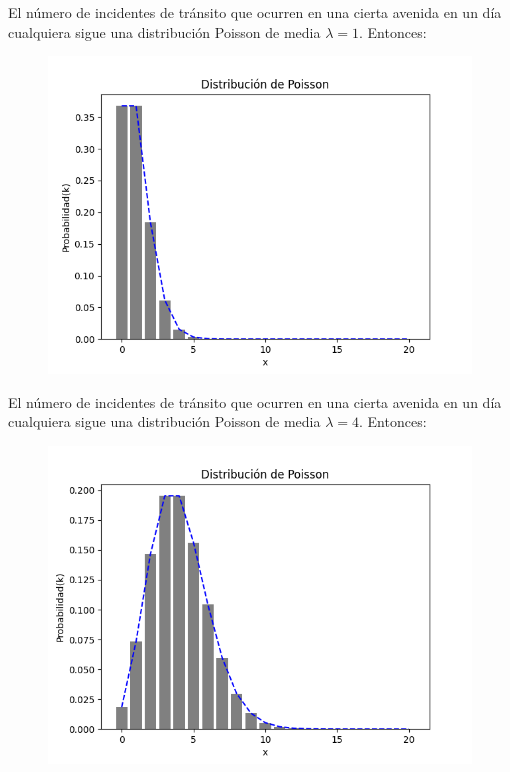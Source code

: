 El número de incidentes de tránsito que ocurren en una cierta avenida en un día
cualquiera sigue una distribución Poisson de media $\lambda=1$. Entonces:

  \begin{figure}
    \centering
    \includegraphics[scale=0.6]{../slides/figures/poisson_distribution_lambda_1.png}
  \end{figure}

El número de incidentes de tránsito que ocurren en una cierta avenida en un día
cualquiera sigue una distribución Poisson de media $\lambda=4$. Entonces:

  \begin{figure}
    \centering
    \includegraphics[scale=0.6]{../slides/figures/poisson_distribution_lambda_4.png}
  \end{figure}

